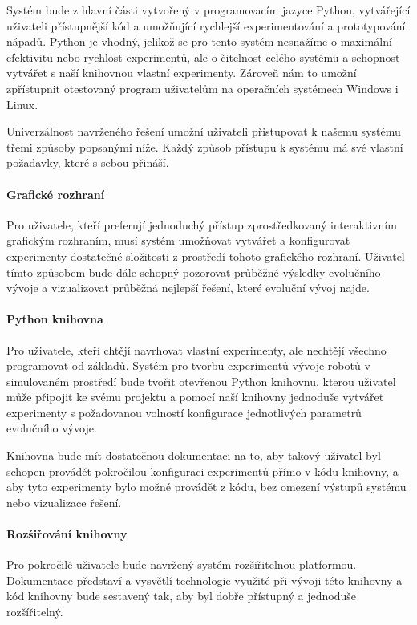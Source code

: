 Systém bude z hlavní části vytvořený v programovacím jazyce Python, vytvářející
uživateli přístupnější kód a umožňující rychlejší experimentování a
prototypování nápadů. Python je vhodný, jelikož se pro tento systém nesnažíme o
maximální efektivitu nebo rychlost experimentů, ale o čitelnost celého systému
a schopnost vytvářet s naší knihovnou vlastní experimenty. Zároveň nám to
umožní zpřístupnit otestovaný program uživatelům na operačních systémech
Windows i Linux.

Univerzálnost navrženého řešení umožní uživateli přistupovat k našemu systému
třemi způsoby popsanými níže. Každý způsob přístupu k systému má své vlastní
požadavky, které s sebou přináší. 

\paragraph{Grafické rozhraní}
Pro uživatele, kteří preferují jednoduchý přístup zprostředkovaný
interaktivním grafickým rozhraním, musí systém umožňovat vytvářet a
konfigurovat experimenty dostatečné složitosti z prostředí tohoto grafického
rozhraní. Uživatel tímto způsobem bude dále schopný pozorovat průběžné výsledky
evolučního vývoje a vizualizovat průběžná nejlepší řešení, které evoluční vývoj
najde.

\paragraph{Python knihovna}
Pro uživatele, kteří chtějí navrhovat vlastní experimenty, ale nechtějí všechno
programovat od základů. Systém pro tvorbu experimentů vývoje robotů v simulovaném prostředí bude tvořit
otevřenou Python knihovnu, kterou uživatel může připojit ke svému
projektu a pomocí naší knihovny jednoduše vytvářet experimenty s požadovanou
volností konfigurace jednotlivých parametrů evolučního vývoje.

Knihovna bude mít dostatečnou dokumentaci na to, aby takový uživatel byl
schopen provádět pokročilou konfiguraci experimentů přímo v kódu knihovny, a
aby tyto experimenty bylo možné provádět z kódu, bez omezení výstupů systému
nebo vizualizace řešení.

\paragraph{Rozšiřování knihovny}
Pro pokročilé uživatele bude navržený systém rozšiřitelnou platformou. Dokumentace
představí a vysvětlí technologie využité při vývoji této knihovny a kód
knihovny bude sestavený tak, aby byl dobře přístupný a jednoduše rozšířitelný.
